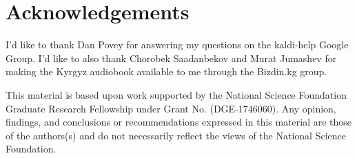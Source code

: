 \documentclass[a4paper]{article}
\begin{document}
\section{Acknowledgements}

I'd like to thank Dan Povey for answering my questions on the kaldi-help Google Group. I'd like to also thank Chorobek Saadanbekov and Murat Jumashev for making the Kyrgyz audiobook available to me through the Bizdin.kg group.

This material is based upon work supported by the National Science Foundation Graduate Research Fellowship under Grant No. (DGE-1746060). Any opinion, findings, and conclusions or recommendations expressed in this material are those of the authors(s) and do not necessarily reflect the views of the National Science Foundation.





\newpage



\end{document}
